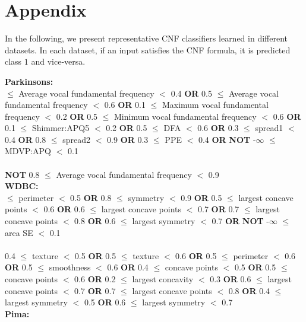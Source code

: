 
\section*{Appendix}

In the following, we present representative CNF classifiers learned in different datasets. In each dataset, if an input satisfies the CNF formula, it is predicted class $ 1 $ and vice-versa.

\noindent \textbf{ Parkinsons: }\\

 $\le$ Average vocal fundamental frequency $<$ 0.4 \textbf{OR} 0.5 $\le$ Average vocal fundamental frequency $<$ 0.6 \textbf{OR} 0.1 $\le$ Maximum vocal fundamental frequency $<$ 0.2 \textbf{OR} 0.5 $\le$ Minimum vocal fundamental frequency $<$ 0.6 \textbf{OR} 0.1 $\le$ Shimmer:APQ5 $<$ 0.2 \textbf{OR} 0.5 $\le$ DFA $<$ 0.6 \textbf{OR} 0.3 $\le$ spread1 $<$ 0.4 \textbf{OR} 0.8 $\le$ spread2 $<$ 0.9 \textbf{OR} 0.3 $\le$ PPE $<$ 0.4 \textbf{OR}  \textbf{NOT} -$\infty$ $\le$ MDVP:APQ $<$ 0.1 \\\\ \textbf{NOT} 0.8 $\le$ Average vocal fundamental frequency $<$ 0.9 \\

\noindent \textbf{ WDBC: }\\

 $\le$ perimeter $<$ 0.5 \textbf{OR} 0.8 $\le$ symmetry $<$ 0.9 \textbf{OR} 0.5 $\le$ largest concave points $<$ 0.6 \textbf{OR} 0.6 $\le$ largest concave points $<$ 0.7 \textbf{OR} 0.7 $\le$ largest concave points $<$ 0.8 \textbf{OR} 0.6 $\le$ largest symmetry $<$ 0.7 \textbf{OR}  \textbf{NOT} -$\infty$ $\le$ area SE $<$ 0.1 \\\\0.4 $\le$ texture $<$ 0.5 \textbf{OR} 0.5 $\le$ texture $<$ 0.6 \textbf{OR} 0.5 $\le$ perimeter $<$ 0.6 \textbf{OR} 0.5 $\le$ smoothness $<$ 0.6 \textbf{OR} 0.4 $\le$ concave points $<$ 0.5 \textbf{OR} 0.5 $\le$ concave points $<$ 0.6 \textbf{OR} 0.2 $\le$ largest concavity $<$ 0.3 \textbf{OR} 0.6 $\le$ largest concave points $<$ 0.7 \textbf{OR} 0.7 $\le$ largest concave points $<$ 0.8 \textbf{OR} 0.4 $\le$ largest symmetry $<$ 0.5 \textbf{OR} 0.6 $\le$ largest symmetry $<$ 0.7 \\

\noindent \textbf{ Pima: }\\

